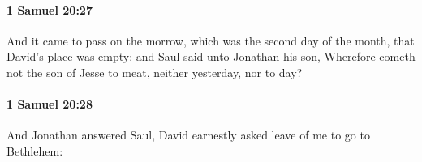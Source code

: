 		\paragraph{1 Samuel 20:27} %
			\label{1SAMUEL-20-27}

			And it came to pass on the morrow, which was the second day of the month, that David’s place was empty: and Saul said unto Jonathan his son, Wherefore cometh not the son of Jesse to meat, neither yesterday, nor to day?


		\paragraph{1 Samuel 20:28} %
			\label{1SAMUEL-20-28}

			And Jonathan answered Saul, David earnestly asked leave of me to go to Bethlehem:


